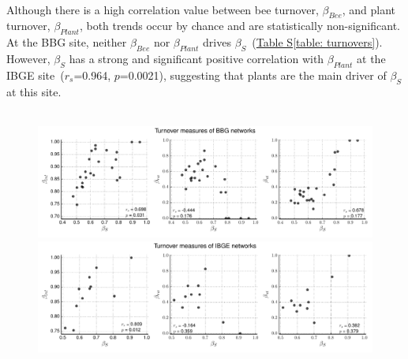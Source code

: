 \documentclass[11pt]{article}
\begin{document}
\\
Although there is a high correlation value between bee turnover, $\beta_{Bee}$, and plant turnover, $\beta_{Plant}$, both trends occur by chance and are statistically non-significant. At the BBG site, neither $\beta_{Bee}$ nor $\beta_{Plant}$ drives $\beta_{S}$~(\hyperref[table: turnovers]{Table S\ref{table: turnovers}}). However, $\beta_{S}$ has a strong and significant positive correlation with $\beta_{Plant}$ at the IBGE site~($r_{s}$=0.964, $p$=0.0021), suggesting that plants are the main driver of $\beta_{S}$ at this site.\\
\\
\begin{figure}[H]
  \centering
    \includegraphics[width=1.1\textwidth]{turnoversbivariate(old).pdf}
    \includegraphics[width=1.1\textwidth]{turnoversbivariate(new).pdf}
       \label{fig: turnoversbivariate}
\end{figure}
\vspace{2cm}
\end{document}

